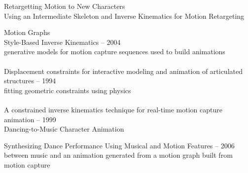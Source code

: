 Retargetting Motion to New Characters\\
Using an Intermediate Skeleton and Inverse Kinematics for Motion Retargeting

Motion Graphs\\
Style-Based Inverse Kinematics -- 2004\\
generative models for motion capture sequences used to build animations\\\\
Displacement constraints for interactive modeling and animation of articulated structures -- 1994\\
fitting geometric constraints using physics\\\\
A constrained inverse kinematics technique for real-time motion capture animation -- 1999\\
Dancing-to-Music Character Animation

Synthesizing Dance Performance Using Musical and Motion Features -- 2006\\
between music and an animation generated from a motion graph built from motion capture
